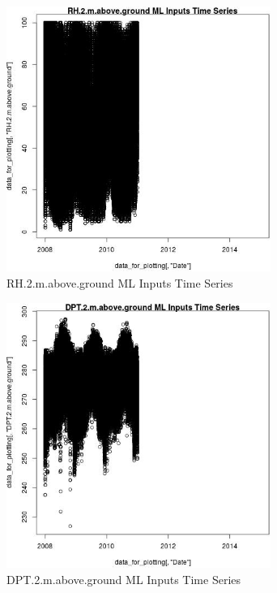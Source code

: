 \begin{figure} 
\centering  
\includegraphics[width=0.77\textwidth]{Code_Outputs/ML_input_report_ML_input_PM25_Step5_part_d_de_duplicated_aves_ML_input_RH.2.m.above.groundTS.jpg} 
\caption{\label{fig:ML_input_report_ML_input_PM25_Step5_part_d_de_duplicated_aves_ML_inputRH.2.m.above.groundTS}RH.2.m.above.ground ML Inputs Time Series} 
\end{figure} 
 

\begin{figure} 
\centering  
\includegraphics[width=0.77\textwidth]{Code_Outputs/ML_input_report_ML_input_PM25_Step5_part_d_de_duplicated_aves_ML_input_DPT.2.m.above.groundTS.jpg} 
\caption{\label{fig:ML_input_report_ML_input_PM25_Step5_part_d_de_duplicated_aves_ML_inputDPT.2.m.above.groundTS}DPT.2.m.above.ground ML Inputs Time Series} 
\end{figure} 
 

